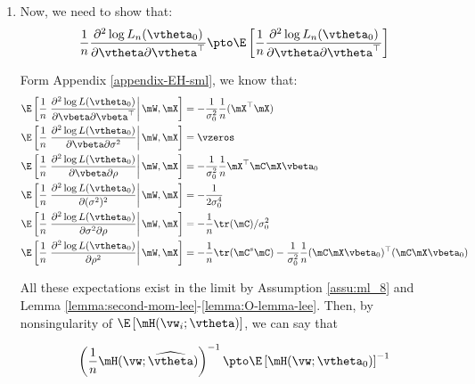 \documentclass[english,12pt]{book}\usepackage[]{graphicx}\usepackage[]{xcolor}
\begin{document}
\begin{subappendices}
\begin{enumerate}
   
   \item Now, we need to show that:
   \begin{equation}
     \frac{1}{n}\frac{\partial^2 \log L_n(\vtheta_0)}{\partial \vtheta \partial \vtheta^\top}\pto \E\left[\frac{1}{n}\frac{\partial^2 \log L_n(\vtheta_0)}{\partial \vtheta \partial \vtheta^\top}\right]
   \end{equation}
   
   Form Appendix \ref{appendix-EH-sml}, we know that:
   \begin{equation*}
    \begin{aligned}
     \E\left[\frac{1}{n}\left.\frac{\partial^2  \log L(\vtheta_0)}{\partial \vbeta \partial \vbeta^\top} \right|\mW, \mX\right] & = -\frac{1}{\sigma^2_0}\frac{1}{n}(\mX^\top\mX) \\
     \E\left[\frac{1}{n}\left.\frac{\partial^2  \log L(\vtheta_0)}{\partial \vbeta \partial \sigma^2} \right|\mW, \mX\right] & = \vzeros \\
      \E\left[\frac{1}{n}\left.\frac{\partial^2  \log L(\vtheta_0)}{\partial \vbeta \partial \rho} \right|\mW, \mX\right] & = - \frac{1}{\sigma^2_0} \frac{1}{n}\mX^\top\mC\mX\vbeta_0 \\
      \E\left[\frac{1}{n}\left.\frac{\partial^2 \log L(\vtheta_0)}{\partial (\sigma^2)^2}\right|\mW, \mX\right] & = - \frac{1}{2\sigma^4_0}  \\
      \E\left[\frac{1}{n}\left.\frac{\partial^2 \log L(\vtheta_0)}{\partial \sigma^2 \partial \rho}\right|\mW,\mX\right] & = - \frac{1}{n}\tr(\mC)/\sigma^2_0 \\
      \E\left[\frac{1}{n}\left.\frac{\partial^2 \log L(\vtheta_0)}{\partial \rho ^2}\right|\mW, \mX\right] & = - \frac{1}{n}\tr(\mC^s\mC) - \frac{1}{\sigma^2_0}\frac{1}{n}(\mC\mX\vbeta_0)^\top(\mC\mX\vbeta_0)
    \end{aligned}
   \end{equation*}
   
   All these expectations exist in the limit by Assumption \ref{assu:ml_8} and Lemma \ref{lemma:second-mom-lee}-\ref{lemma:O-lemma-lee}. Then, by nonsingularity of $\E\left[\mH(\vw_i;\vtheta)\right]$, we can say that 
   
   \begin{equation*}
   \left(\frac{1}{n}\mH(\vw;\widehat{\vtheta})\right)^{-1}\pto \E\left[\mH(\vw;\vtheta_0)\right]^{-1}
   \end{equation*}
   


\end{enumerate}
\end{subappendices}
\end{document}
